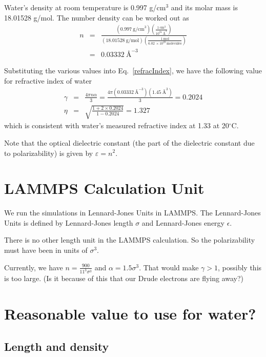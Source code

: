 \documentclass[aps, 12pt, amsmath, amssymb, onecolumn, notitlepage, nofootinbib]{revtex4-1}
\begin{document}
Water's density at room temperature is 0.997 g/cm$^3$ and its molar mass is 18.01528 g/mol. The number density can be worked out as
\begin{eqnarray}
n &=&  \frac{(0.997\ \text{g/cm}^3) \left( \frac{1\ \text{cm}^3}{10^{24}\ \text{\AA}^3} \right)}{(18.01528\ \text{g/mol}) \left( \frac{1\ \text{mol}}{6.02\ \times 10^{23}\ \text{molecules} }\right)}\nonumber\\
&=& 0.03332\ \text{\AA}^{-3}
\label{numberDenisty}
\end{eqnarray}


Substituting the various values into Eq.~\eqref{refracIndex}, we have the following value for refractive index of water
\begin{eqnarray}
\gamma &=& \frac{4\pi n\alpha}{3} = \frac{4\pi (0.03332\ \text{\AA}^{-3})( 1.45\ \text{\AA}^3)}{3} =0.2024 \nonumber\\
\eta &=&  \sqrt{\frac{1 + 2\times 0.2024 }{1-0.2024}} = 1.327
\end{eqnarray}
which is consistent with water's measured refractive index at 1.33 at 20$^\circ$C.

Note that the optical dielectric constant (the part of the dielectric constant due to polarizability) is given by $\varepsilon = n^2$.   


\section{LAMMPS Calculation Unit}

We run the simulations in Lennard-Jones Units in LAMMPS. The Lennard-Jones Units is defined by Lennard-Jones length $\sigma$ and Lennard-Jones energy $\epsilon$.

There is no other length unit in the LAMMPS calculation. So the polarizability must have been in units of $\sigma^3$. 

Currently, we have $n = \frac{900}{11^3 \sigma^3}$ and $\alpha = 1.5 \sigma^3$. That would make $\gamma>1$, possibly this is too large. (Is it because of this that our Drude electrons are flying away?)


\section{Reasonable value to use for water?}

\subsection{Length and density}
\end{document}
